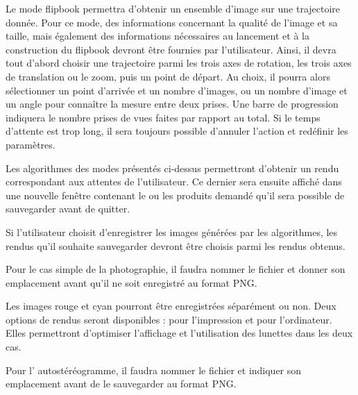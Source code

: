 \begin{description}[style=nextline]
	\item[Mode flipbook]	
	\mbox{\hspace{1cm}}Le mode flipbook permettra d’obtenir un ensemble d’image sur une trajectoire donnée. Pour ce mode, des informations concernant la qualité de l’image et sa taille, mais également des informations nécessaires au lancement et à la construction du flipbook devront être fournies par l’utilisateur. Ainsi, il devra tout d’abord choisir une trajectoire parmi les trois axes de rotation, les trois axes de translation ou le zoom, puis un point de départ. Au choix, il pourra alors sélectionner un point d’arrivée et un nombre d’images, ou un nombre d’image et un angle pour connaître la mesure entre deux prises. Une barre de progression indiquera le nombre prises de vues faites par rapport au total. Si le temps d’attente est trop long, il sera toujours possible d’annuler l’action et redéfinir les paramètres.
	
	\item[Affichage du rendu]
	\mbox{\hspace{1cm}}Les algorithmes des modes présentés ci-dessus permettront d’obtenir un rendu correspondant aux attentes de l’utilisateur. Ce dernier sera ensuite affiché dans une nouvelle fenêtre contenant le ou les produits demandé qu’il sera possible de sauvegarder avant de quitter.
	
	\item[Enregistrement du rendu]
	\mbox{\hspace{1cm}} Si l’utilisateur choisit d’enregistrer les images générées par les algorithmes, les rendus qu’il souhaite sauvegarder devront être choisis parmi les rendus obtenus.
	
	\item[Enregistrement de la photographie]
	\mbox{\hspace{1cm}}	Pour le cas simple de la photographie, il faudra nommer le fichier et donner son emplacement avant qu’il ne soit enregistré au format PNG.
	
	\item[Enregistrement de l'anaglyphe]
	\mbox{\hspace{1cm}} Les images rouge et cyan pourront être enregistrées séparément ou non. Deux options de rendus seront disponibles : pour l’impression et pour l’ordinateur. Elles permettront d’optimiser l’affichage et l’utilisation des lunettes dans les deux cas. 
	
	\item[Enregistrement de l'autostéréogramme]
	\mbox{\hspace{1cm}}	Pour l' autostéréogramme, il faudra nommer le fichier et indiquer son emplacement avant de le sauvegarder au format PNG.
	

\end{description}
